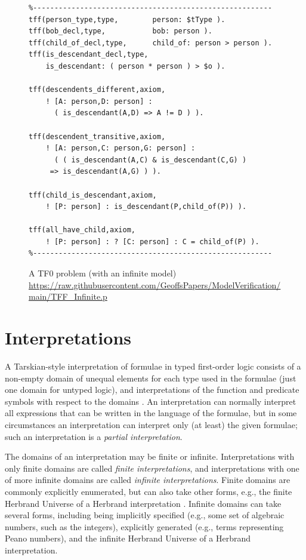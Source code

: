 \documentclass[letterpaper]{article}
\begin{document}
\begin{figure}[t!]
\scriptsize
{}
\begin{verbatim}
%--------------------------------------------------------
tff(person_type,type,        person: $tType ).
tff(bob_decl,type,           bob: person ).
tff(child_of_decl,type,      child_of: person > person ).
tff(is_descendant_decl,type, 
    is_descendant: ( person * person ) > $o ).

tff(descendents_different,axiom,
    ! [A: person,D: person] : 
      ( is_descendant(A,D) => A != D ) ).

tff(descendent_transitive,axiom,
    ! [A: person,C: person,G: person] :
      ( ( is_descendant(A,C) & is_descendant(C,G) ) 
     => is_descendant(A,G) ) ).

tff(child_is_descendant,axiom,
    ! [P: person] : is_descendant(P,child_of(P)) ).

tff(all_have_child,axiom,
    ! [P: person] : ? [C: person] : C = child_of(P) ).
%--------------------------------------------------------
\end{verbatim}
\caption{A TF0 problem (with an infinite model)\\
{\scriptsize \url{https://raw.githubusercontent.com/GeoffsPapers/ModelVerification/main/TFF_Infinite.p}}}
\label{TF0InfiniteProblem}
\end{figure}

\section{Interpretations}
\label{Interpretations}

A Tarskian-style interpretation \cite{TV56} of formulae in typed first-order logic consists of a 
non-empty domain of unequal elements for each type used in the formulae (just one domain for 
untyped logic), and interpretations of the function and predicate symbols with respect to the 
domains \cite{Hun96}.
An interpretation can normally interpret all expressions that can be written in the language of 
the formulae, but in some circumstances an interpretation can interpret only (at least) the given 
formulae; such an interpretation is a {\em partial interpretation}.

The domains of an interpretation may be finite or infinite.
Interpretations with only finite domains are called {\em finite interpretations}, and
interpretations with one of more infinite domains are called {\em infinite interpretations}.
Finite domains are commonly explicitly enumerated, but can also take other forms, e.g., the 
finite Herbrand Universe of a Herbrand interpretation \cite{Her30}.
Infinite domains can take several forms, including being implicitly specified (e.g., some set
of algebraic numbers, such as the integers), explicitly generated (e.g., terms representing 
Peano numbers), and the infinite Herbrand Universe of a Herbrand interpretation.
\end{document}
